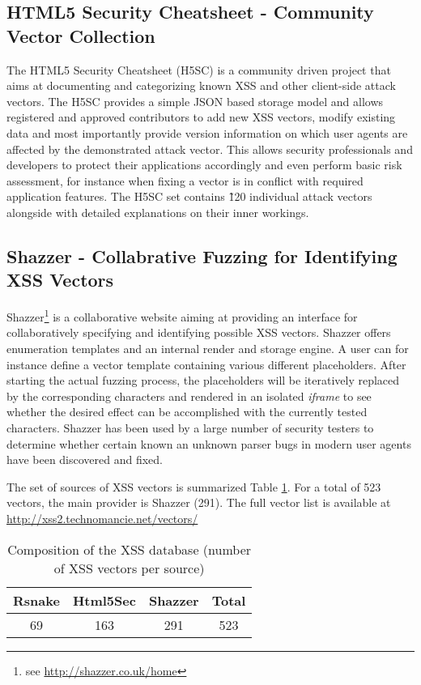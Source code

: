 \documentclass[10pt]{IEEEtran}
\begin{document}
\subsection{HTML5 Security Cheatsheet - Community Vector Collection}
\label{subsec:html5_security_cheatsheet}
The HTML5 Security Cheatsheet (H5SC) is a community driven project that aims at documenting and categorizing known XSS and other client-side attack vectors. 
The H5SC provides a simple JSON based storage model and allows registered and
approved contributors to add new XSS vectors, modify existing data and most 
importantly provide version information on which user agents are affected by 
the demonstrated attack vector. This allows security professionals and
developers to protect their applications accordingly and even perform basic 
risk assessment, for instance when fixing a vector is in conflict with required application 
features. The H5SC set contains  \~120 individual attack vectors 
alongside with detailed explanations on their inner workings.




\subsection{Shazzer - Collabrative Fuzzing for Identifying XSS Vectors}
\label{subsec:shazzer_community_fuzzing_for_browser_bugs_leveraging_xss}
Shazzer\footnote{see \url{http://shazzer.co.uk/home}} is a collaborative website aiming at providing 
an interface for collaboratively specifying and  identifying possible XSS vectors. 
Shazzer offers  enumeration templates and an internal render and storage engine.
A user can for instance define a vector template containing various different placeholders. 
After starting the actual fuzzing process, the placeholders will be iteratively replaced
by the corresponding characters and rendered in an isolated \emph{iframe} to see whether the desired effect 
can be accomplished with the currently tested characters. Shazzer has been used by a large number of security
testers to determine whether certain known an unknown parser bugs in modern user agents have been discovered and fixed.




The set of sources of XSS vectors is summarized Table \ref{tab:vectorsource}. For a total of 523 vectors, 
the main provider is Shazzer (291). The full vector list is available 
at \url{http://xss2.technomancie.net/vectors/}


\begin{table}
  \centering
   \caption{Composition of the XSS database (number of XSS vectors per source)}
    \begin{tabular}{c|c|c|c}
    \hline
     Rsnake & Html5Sec & Shazzer & Total \\
    \hline
     69    & 163   & 291 & 523 \\
    \hline
    \end{tabular}
  \label{tab:vectorsource}
\end{table}
\end{document}
